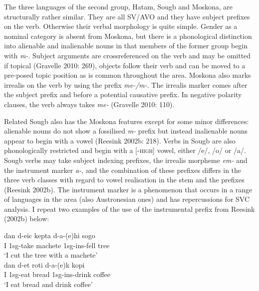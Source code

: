 The three languages of the second group, Hatam, Sougb and Moskona, are structurally rather similar. They are all SV/AVO and they have subject prefixes on the verb. Otherwise their verbal morphology is quite simple. Gender as a nominal category is absent from Moskona, but there is a phonological distinction into alienable and inalienable nouns in that members of the former group begin with \textit{m-}. Subject arguments are crossreferenced on the verb and may be omitted if topical (Gravelle 2010: 269), objects follow their verb and can be moved to a pre-posed topic position as is common throughout the area. Moskona also marks irrealis on the verb by using the prefix \textit{me-/m-}. The irrealis marker comes after the subject prefix and before a potential causative prefix. In negative polarity clauses, the verb always takes \textit{me-} (Gravelle 2010: 110). 

Related Sougb also has the Moskona features except for some minor differences: alienable nouns do not show a fossilised \textit{m-} prefix but instead inalienable nouns appear to begin with a vowel (Reesink 2002b: 218). Verbs in Sougb are also phonologically restricted and begin with a [-\textsc{high}] vowel, either /e/, /o/ or /a/. Sougb verbs may take subject indexing prefixes, the irrealis morpheme \textit{em-} and the instrument marker \textit{a-}, and the combination of these prefixes differs in the three verb classes with regard to vowel realisation in the stem and the prefixes (Reesink 2002b). The instrument marker is a phenomenon that occurs in a range of languages in the area (also Austronesian ones) and has repercussions for SVC analysis. I repeat two examples of the use of the instrumental prefix from Reesink (2002b) below:

\pex 
\a
\gll dan d-eic kepta d-a-(e)hi sogo \\
I \acs{1}\acs{sg}-take machete \acs{1}\acs{sg}-\acs{ins}-fell tree \\
\glft `I cut the tree with a machete' \\ 
\z
\a \label{sougb1}
\gla dan d-et roti d-a-(e)k kopi \\ 
I \acs{1}\acs{sg}-eat bread \acs{1}\acs{sg}-\acs{ins}-drink coffee \\
\glft `I eat bread and drink coffee' \\ 
\z
\xe

